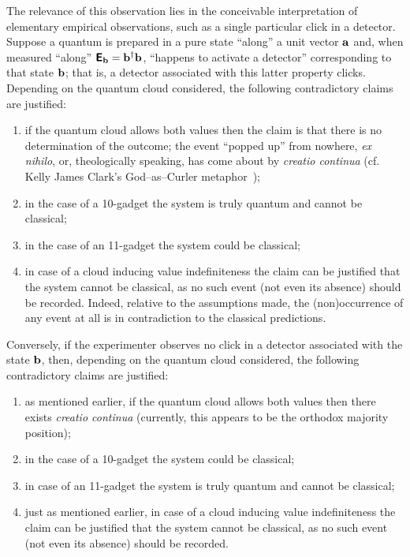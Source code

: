 \documentclass[%
  reprint,
  twocolumn,
 showpacs,
 showkeys,
 preprintnumbers,
 amsmath,amssymb,
 aps,
  prl,
  longbibliography,
 ]{revtex4-1}
\begin{document}
The relevance of this observation lies in the conceivable interpretation of elementary empirical observations,
such as a single particular click in a detector.
Suppose a quantum is prepared in a pure state ``along'' a unit vector ${\bf a}$ and, when measured ``along''
$\textsf{\textbf{E}}_{\bf b}={\bf b}^\dagger  {\bf b}$,
``happens to activate a detector'' corresponding to that state ${\bf b}$;
that is, a detector associated with this latter property clicks.
Depending on the quantum cloud considered, the following contradictory claims are justified:
\begin{enumerate}
\item
if the quantum cloud allows both values then the claim is that there is no determination of the outcome; the event ``popped up'' from nowhere, {\it ex nihilo},
or, theologically speaking, has come about by {\it creatio continua} (cf. Kelly James Clark's God--as--Curler metaphor~\cite{Clark-2017-GodAsCurler});
\item
in the case of a 10-gadget the system is truly quantum and cannot be classical;
\item
in the case of an 11-gadget the  system could be classical;
\item
in case of a cloud inducing value indefiniteness the claim can be justified that the system cannot be classical, as no such event (not even its absence)
should be recorded. Indeed, relative to the assumptions made, the (non)occurrence of any event at all is in contradiction to the classical predictions.
\end{enumerate}
Conversely, if the experimenter observes no click in a detector associated with the  state $  {\bf b} $,
then, depending on the quantum cloud considered, the following contradictory claims are justified:
\begin{enumerate}
\item
as mentioned earlier, if the quantum cloud allows both values then there exists {\it creatio continua}
(currently, this appears to be the orthodox majority position);
\item
in the case of a 10-gadget the system could be classical;
\item
in case of an 11-gadget the system is truly quantum and cannot be classical;
\item
just as mentioned earlier, in case of a cloud inducing value indefiniteness the claim can be justified that the system cannot be classical, as no such event (not even its absence)
should be recorded.
\end{enumerate}
\end{document}
